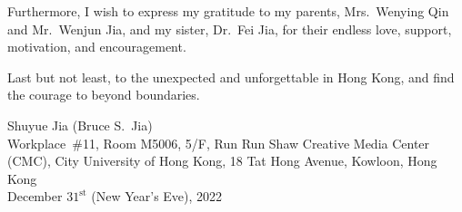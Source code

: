 \begin{acknowledgement}
Furthermore, I wish to express my gratitude to my parents, Mrs.~Wenying Qin and Mr.~Wenjun Jia, and my sister, Dr.~Fei Jia, for their endless love, support, motivation, and encouragement.

Last but not least, to the unexpected and unforgettable in Hong Kong, and find the courage to beyond boundaries.
\newline

\noindent Shuyue Jia (Bruce S.~Jia)\\
\noindent Workplace~\#11, Room M5006, 5/F, Run Run Shaw Creative Media Center (CMC), City University of Hong Kong, 18 Tat Hong Avenue, Kowloon, Hong Kong\\
\noindent December $31^{\mathrm{st}}$ (New Year's Eve), 2022

\end{acknowledgement}